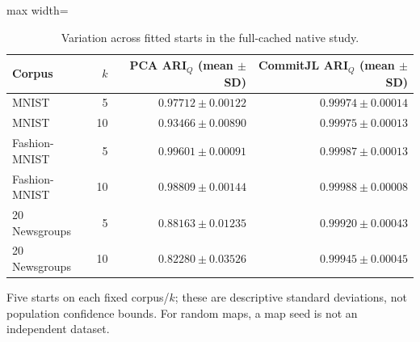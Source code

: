 \begin{table}[tp]
\caption{Variation across fitted starts in the full-cached native study.}\label{tab:variability}
\centering\small
\begin{adjustbox}{max width=\textwidth}
\begin{tabular}{@{}lrrr@{}}
\toprule
Corpus & $k$ & PCA ARI$_Q$ (mean $\pm$ SD) & CommitJL ARI$_Q$ (mean $\pm$ SD) \\
\midrule
MNIST & 5 & $0.97712 \pm 0.00122$ & $0.99974 \pm 0.00014$ \\
MNIST & 10 & $0.93466 \pm 0.00890$ & $0.99975 \pm 0.00013$ \\
Fashion-MNIST & 5 & $0.99601 \pm 0.00091$ & $0.99987 \pm 0.00013$ \\
Fashion-MNIST & 10 & $0.98809 \pm 0.00144$ & $0.99988 \pm 0.00008$ \\
20 Newsgroups & 5 & $0.88163 \pm 0.01235$ & $0.99920 \pm 0.00043$ \\
20 Newsgroups & 10 & $0.82280 \pm 0.03526$ & $0.99945 \pm 0.00045$ \\
\bottomrule
\end{tabular}
\end{adjustbox}
\par\vspace{3pt}\begin{minipage}{0.98\textwidth}\footnotesize Five starts on each fixed corpus/$k$; these are descriptive standard deviations, not population confidence bounds. For random maps, a map seed is not an independent dataset.\end{minipage}
\end{table}
